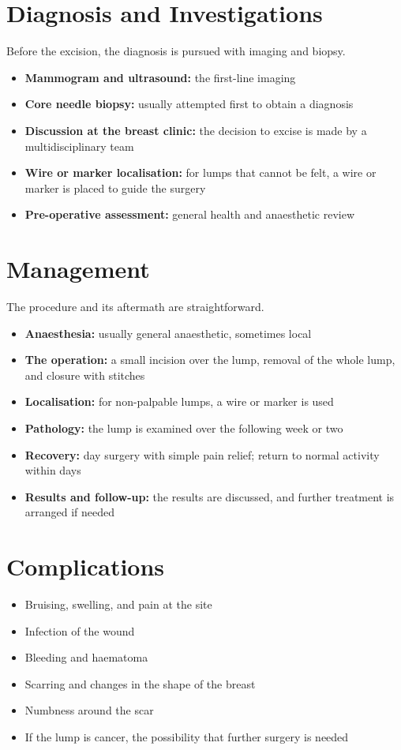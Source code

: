 \section*{Diagnosis and Investigations}
Before the excision, the diagnosis is pursued with imaging and biopsy.
\begin{itemize}
    \item \textbf{Mammogram and ultrasound:} the first-line imaging
    \item \textbf{Core needle biopsy:} usually attempted first to obtain a diagnosis
    \item \textbf{Discussion at the breast clinic:} the decision to excise is made by a multidisciplinary team
    \item \textbf{Wire or marker localisation:} for lumps that cannot be felt, a wire or marker is placed to guide the surgery
    \item \textbf{Pre-operative assessment:} general health and anaesthetic review
\end{itemize}

\section*{Management}
The procedure and its aftermath are straightforward.
\begin{itemize}
    \item \textbf{Anaesthesia:} usually general anaesthetic, sometimes local
    \item \textbf{The operation:} a small incision over the lump, removal of the whole lump, and closure with stitches
    \item \textbf{Localisation:} for non-palpable lumps, a wire or marker is used
    \item \textbf{Pathology:} the lump is examined over the following week or two
    \item \textbf{Recovery:} day surgery with simple pain relief; return to normal activity within days
    \item \textbf{Results and follow-up:} the results are discussed, and further treatment is arranged if needed
\end{itemize}

\section*{Complications}
\begin{itemize}
    \item Bruising, swelling, and pain at the site
    \item Infection of the wound
    \item Bleeding and haematoma
    \item Scarring and changes in the shape of the breast
    \item Numbness around the scar
    \item If the lump is cancer, the possibility that further surgery is needed
\end{itemize}

